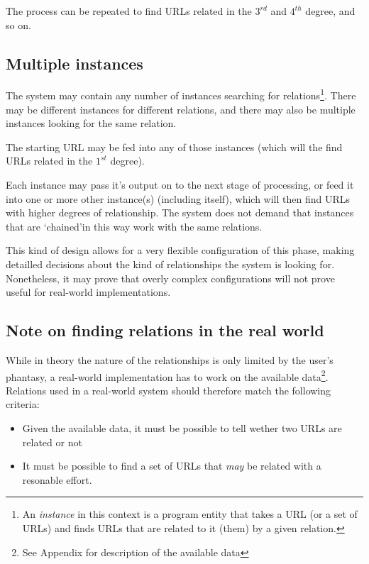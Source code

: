 \documentclass[a4paper]{danarticle}
\begin{document}
       The process can be repeated to find URLs related in the 
       $ 3^{rd} $ and $ 4^{th} $ degree, and so on.
     \subsection*{Multiple instances}
       The system may contain any number of instances searching
       for relations\footnote{An \textit{instance} in this
       context is a program entity that takes a URL (or a
       set of URLs) and finds URLs that are related to it (them)
       by a given relation.}. There may be different instances
       for different relations, and there may also be multiple
       instances looking for the same relation. 
       
       The starting URL may be fed into any of those instances
       (which will the find URLs related in the $ 1^{st} $
       degree). 
       
       Each instance may pass it's output on to the next stage
       of processing, or feed it into one or more other instance(s) 
       (including itself), which will then find URLs with higher
       degrees of relationship. The system does not demand that
       instances that are \lq chained\rq in this way work with
       the same relations. 
       
       This kind of design allows for a very flexible configuration
       of this phase, making detailled decisions about the kind
       of relationships the system is looking for.
       Nonetheless, it may prove that overly complex configurations
       will not prove useful for real-world implementations.
     \subsection*{Note on finding relations in the real world}
       While in theory the nature of the relationships is only
       limited by the user's phantasy, a real-world implementation
       has to work on the available data\footnote{See Appendix for
       description of the available data}. Relations used in a
       real-world system should therefore match the following
       criteria:
       \begin{itemize}
         \item{Given the available data, it must be possible to
	       tell wether two URLs are related or not}
	 \item{It must be possible to find a set of 
	       URLs that \textit{may} be related with
	       a resonable effort.}
       \end{itemize}
\end{document}
